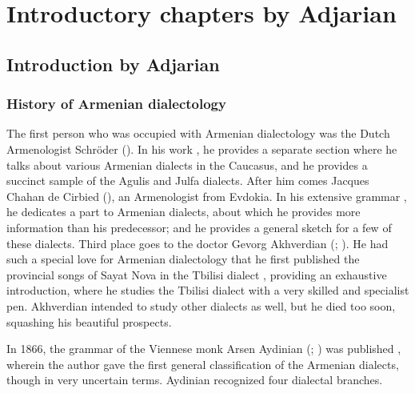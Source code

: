 \part{Introductory chapters by Adjarian}

 





\chapter{Introduction by Adjarian}




\section{History of Armenian dialectology}

\begin{adjarianpage}\label{page:1}\end{adjarianpage}%

The first person who was occupied with Armenian dialectology was the Dutch Armenologist Schröder (). In his work \citep{Shroder-1711-TheasauresArmenian}, he provides a separate section where he talks about various Armenian dialects in the Caucasus, and he provides a succinct sample of the Agulis and Julfa dialects. After him comes Jacques Chahan de Cirbied (), an Armenologist from Evdokia. In his extensive grammar \citep{Cirbied-1823-GrammarArmenian}, he dedicates a part to Armenian dialects, about which he provides more information than his predecessor; and he provides a general sketch for a few of these dialects. Third place goes to the doctor Gevorg Akhverdian (; ). He had such a special love for Armenian dialectology that he first published the provincial songs of Sayat Nova in the Tbilisi dialect \citep{SayatNova}, providing an exhaustive introduction, where he studies the Tbilisi dialect with a very skilled and specialist pen. Akhverdian intended to study other dialects as well, but he died too soon, squashing his beautiful prospects. 

In 1866, the grammar of the Viennese monk Arsen Aydinian (; ) was published \citep{Aydnian-1867-GrammarArmenian}, wherein the author gave the first general classification of the Armenian dialects, though in very uncertain terms. Aydinian recognized four dialectal branches. 




